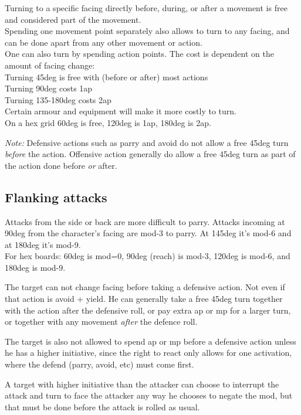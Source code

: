 Turning to a specific facing directly before, during, or after a movement is free and considered part of the movement. \\
Spending one movement point separately also allows to turn to any facing, and can be done apart from any other movement or action. \\
One can also turn by spending action points. The cost is dependent on the amount of facing change: \\
Turning 45deg is free with (before or after) most actions \\
Turning 90deg costs 1ap \\
Turning 135-180deg costs 2ap \\
Certain armour and equipment will make it more costly to turn.\\
On a hex grid 60deg is free, 120deg is 1ap, 180deg is 2ap.

\emph{Note:} Defensive actions such as parry and avoid do not allow a free 45deg turn \emph{before} the action. Offensive action generally do allow a free 45deg turn as part of the action done before \emph{or} after.


\subsection*{Flanking attacks}
Attacks from the side or back are more difficult to parry. Attacks incoming at 90deg from the character's facing are mod-3 to parry. At 145deg it's mod-6 and at 180deg it's mod-9.\\
For hex boards: 60deg is mod=0, 90deg (reach) is mod-3, 120deg is mod-6, and 180deg is mod-9.

The target can not change facing before taking a defensive action. Not even if that action is avoid + yield. He can generally take a free 45deg turn together with the action after the defensive roll, or pay extra ap or mp for a larger turn, or together with any movement \emph{after} the defence roll.

The target is also not allowed to spend ap or mp before a defensive action unless he has a higher initiative, since the right to react only allows for one activation, where the defend (parry, avoid, etc) must come first.

A target with higher initiative than the attacker can choose to interrupt the attack and turn to face the attacker any way he chooses to negate the mod, but that must be done before the attack is rolled as usual.


